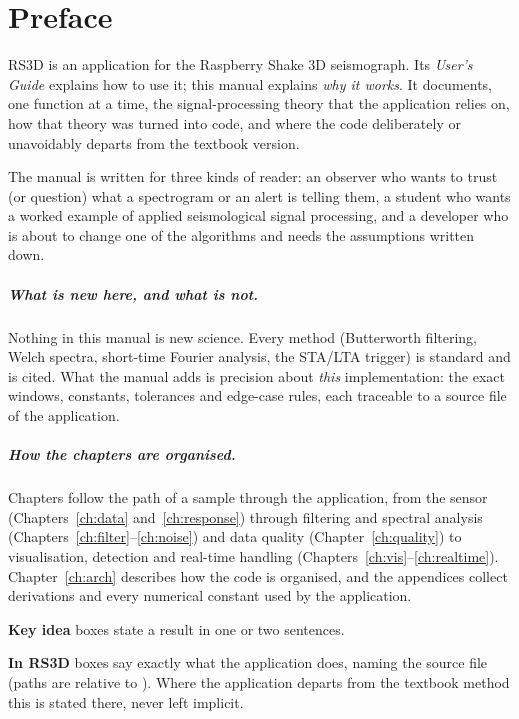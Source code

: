 \chapter*{Preface}

RS3D is an application for the Raspberry Shake 3D seismograph. Its \emph{User's Guide} explains how to use it;
this manual explains \emph{why it works}. It documents, one function at a time, the signal-processing theory that the
application relies on, how that theory was turned into code, and where the code deliberately or unavoidably departs
from the textbook version.

The manual is written for three kinds of reader: an observer who wants to trust (or question) what a spectrogram or an
alert is telling them, a student who wants a worked example of applied seismological signal processing, and a developer
who is about to change one of the algorithms and needs the assumptions written down.

\paragraph{What is new here, and what is not.}
Nothing in this manual is new science. Every method (Butterworth filtering, Welch spectra, short-time Fourier analysis,
the STA/LTA trigger) is standard and is cited. What the manual adds is precision about \emph{this} implementation:
the exact windows, constants, tolerances and edge-case rules, each traceable to a source file of the application.

\paragraph{How the chapters are organised.}
Chapters follow the path of a sample through the application, from the sensor (Chapters~\ref{ch:data}
and~\ref{ch:response}) through filtering and spectral analysis (Chapters~\ref{ch:filter}--\ref{ch:noise}) and data
quality (Chapter~\ref{ch:quality}) to visualisation, detection and real-time handling
(Chapters~\ref{ch:vis}--\ref{ch:realtime}). Chapter~\ref{ch:arch} describes how the code is organised, and the
appendices collect derivations and every numerical constant used by the application.

\begin{rs3dkey}
\textbf{Key idea} boxes state a result in one or two sentences.\par\smallskip
\textbf{In RS3D} boxes say exactly what the application does, naming the source file (paths are relative to
). Where the application departs from the textbook method this is stated there, never
left implicit.
\end{rs3dkey}

